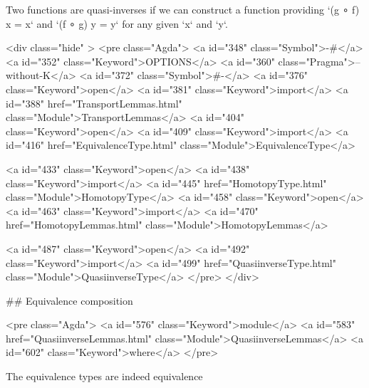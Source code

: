   Two functions are quasi-inverses if we can construct a function providing
`(g ∘ f) x = x` and `(f ∘ g) y = y` for any given `x` and `y`.

<div class="hide" >
<pre class="Agda">
<a id="348" class="Symbol">{-#</a> <a id="352" class="Keyword">OPTIONS</a> <a id="360" class="Pragma">--without-K</a> <a id="372" class="Symbol">#-}</a>
<a id="376" class="Keyword">open</a> <a id="381" class="Keyword">import</a> <a id="388" href="TransportLemmas.html" class="Module">TransportLemmas</a>
<a id="404" class="Keyword">open</a> <a id="409" class="Keyword">import</a> <a id="416" href="EquivalenceType.html" class="Module">EquivalenceType</a>

<a id="433" class="Keyword">open</a> <a id="438" class="Keyword">import</a> <a id="445" href="HomotopyType.html" class="Module">HomotopyType</a>
<a id="458" class="Keyword">open</a> <a id="463" class="Keyword">import</a> <a id="470" href="HomotopyLemmas.html" class="Module">HomotopyLemmas</a>


<a id="487" class="Keyword">open</a> <a id="492" class="Keyword">import</a> <a id="499" href="QuasiinverseType.html" class="Module">QuasiinverseType</a>
</pre>
</div>

## Equivalence composition

<pre class="Agda">
<a id="576" class="Keyword">module</a> <a id="583" href="QuasiinverseLemmas.html" class="Module">QuasiinverseLemmas</a> <a id="602" class="Keyword">where</a>
</pre>

The equivalence types are indeed equivalence

